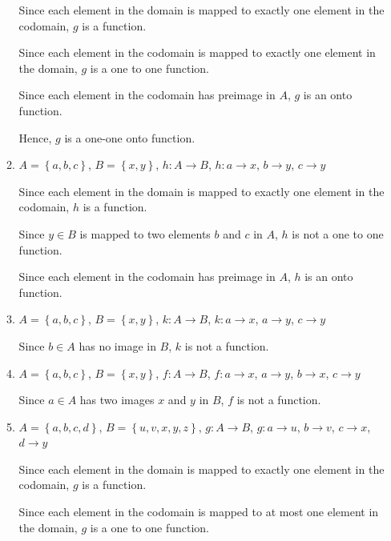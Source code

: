 \documentclass[12pt]{report}
\begin{document}
\begin{enumerate}
\begin{enumerate}
                Since each element in the domain is mapped to exactly one element in the
                codomain, $g$ is a function.

                Since each element in the codomain is mapped to exactly one element in the
                domain, $g$ is a one to one function.

                Since each element in the codomain has preimage in $A$, $g$ is an onto
                function.

                Hence, $g$ is a one-one onto function.

                \newpage

          \item $A = \left\{a, b, c\right\}$, $B = \left\{x, y\right\}$, $h: A \to
                  B$, $h: a \to x$, $b \to y$, $c \to y$
                \sol{}

                Since each element in the domain is mapped to exactly one element in the
                codomain, $h$ is a function.

                Since $y \in B$ is mapped to two elements $b$ and $c$ in $A$, $h$ is not a one
                to one function.

                Since each element in the codomain has preimage in $A$, $h$ is an onto
                function.

          \item $A = \left\{a, b, c\right\}$, $B = \left\{x, y\right\}$, $k: A \to
                  B$, $k: a \to x$, $a \to y$, $c \to y$
                \sol{}

                Since $b \in A$ has no image in $B$, $k$ is not a function.

          \item $A = \left\{a, b, c\right\}$, $B = \left\{x, y\right\}$, $f: A \to B$, $f: a \to x$, $a \to y$, $b \to x$, $c \to y$
                \sol{}

                Since $a \in A$ has two images $x$ and $y$ in $B$, $f$ is not a function.

          \item $A = \left\{a, b, c, d\right\}$, $B = \left\{u, v, x, y, z\right\}$, $g: A \to B$, $g: a \to u$, $b \to v$, $c \to x$, $d \to y$
                \sol{}

                Since each element in the domain is mapped to exactly one element in the
                codomain, $g$ is a function.

                Since each element in the codomain is mapped to at most one element in the
                domain, $g$ is a one to one function.


\end{enumerate}
\end{enumerate}
\end{document}
